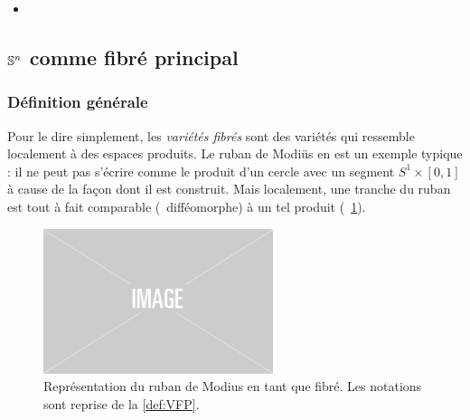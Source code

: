 \begin{itemize}
	
	\item {}
	
\end{itemize}



\subsection{$\S{n}$ comme fibré principal} \label{subsec:VFP}

\subsubsection{Définition générale}\label{subsec:def2VFP}

Pour le dire simplement, les \emph{variétés fibrés} sont des variétés qui ressemble localement à des espaces produits. 
Le ruban de Modiüs en est un exemple typique : il ne peut pas s'écrire comme le produit d'un cercle avec un segment $S^{1}\times [0,1]$ à cause de la façon dont il est construit. Mais localement, une tranche du ruban est tout à fait comparable (\ie~difféomorphe) à un tel produit (\cf~\cref{fig:ruban2modius}).
\begin{figure}[h]
	\includegraphics[width=0.6\textwidth]{fig/placeholder}
	\caption[Ruban de Mobius comme variété fibrée]{Représentation du ruban de Modius en tant que fibré. Les notations sont reprise de la \cref{def:VFP}.}
	\label{fig:ruban2modius}
\end{figure}
\skipl

